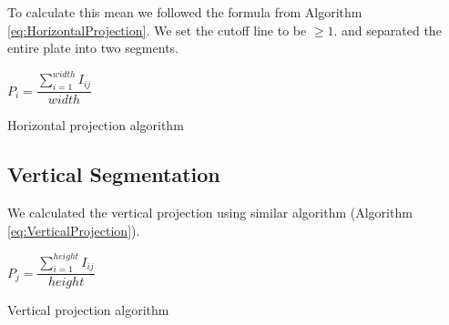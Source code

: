 \documentclass{standalone}
\begin{document}
 To calculate this mean we followed the formula from Algorithm \ref{eq:HorizontalProjection}. We set the cutoff line to be $\geq 1$. and separated the entire plate into two segments. 
\begin{algorithm}
  \begin{algorithmic}
        \State $P_i = \dfrac{ \sum^{width}_{i=1}{ I_{ij} } }{ width }$
    \EndFor
  \end{algorithmic}
  \caption{Horizontal projection algorithm}
  \label{eq:HorizontalProjection}
\end{algorithm}



\subsection{Vertical Segmentation}
We calculated the vertical projection using similar algorithm (Algorithm \ref{eq:VerticalProjection}). 
\begin{algorithm}
  \begin{algorithmic}
        \State $P_j = \dfrac{ \sum^{height}_{i=1}{ I_{ij} } }{ height }$
    \EndFor
  \end{algorithmic}
  \caption{Vertical projection algorithm}
  \label{eq:VerticalProjection}
\end{algorithm}
\end{document}
